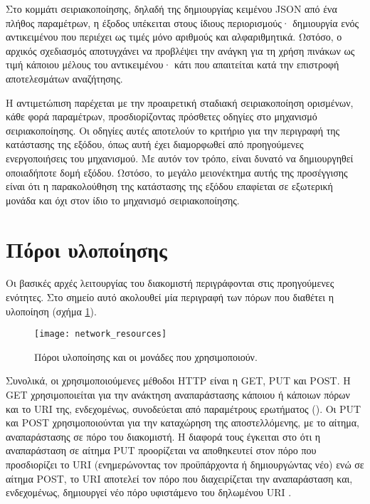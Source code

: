 Στο κομμάτι σειριακοποίησης, δηλαδή της δημιουργίας κειμένου JSON από ένα πλήθος
παραμέτρων, η έξοδος υπέκειται στους ίδιους περιορισμούς· δημιουργία ενός
αντικειμένου που περιέχει ως τιμές μόνο αριθμούς και αλφαριθμητικά. Ωστόσο, ο
αρχικός σχεδιασμός αποτυγχάνει να προβλέψει την ανάγκη για τη χρήση πινάκων ως
τιμή κάποιου μέλους του αντικειμένου· κάτι που απαιτείται κατά την επιστροφή
αποτελεσμάτων αναζήτησης.

Η αντιμετώπιση παρέχεται με την προαιρετική σταδιακή σειριακοποίηση ορισμένων,
κάθε φορά παραμέτρων, προσδιορίζοντας πρόσθετες οδηγίες στο μηχανισμό
σειριακοποίησης. Οι οδηγίες αυτές αποτελούν το κριτήριο για την περιγραφή της
κατάστασης της εξόδου, όπως αυτή έχει διαμορφωθεί από προηγούμενες
ενεργοποιήσεις του μηχανισμού. Με αυτόν τον τρόπο, είναι δυνατό να δημιουργηθεί
οποιαδήποτε δομή εξόδου. Ωστόσο, το μεγάλο μειονέκτημα αυτής της προσέγγισης
είναι ότι η παρακολούθηση της κατάστασης της εξόδου επαφίεται σε εξωτερική
μονάδα και όχι στον ίδιο το μηχανισμό σειριακοποίησης.


\section{Πόροι υλοποίησης}
\label{sec:network:impl-resources}


Οι βασικές αρχές λειτουργίας του διακομιστή περιγράφονται στις προηγούμενες
ενότητες. Στο σημείο αυτό ακολουθεί μία περιγραφή των πόρων που διαθέτει η
υλοποίηση (σχήμα \ref{fig:network:resources}).

\begin{figure}
    \caption{Πόροι υλοποίησης και οι μονάδες που χρησιμοποιούν.
    \label{fig:network:resources}}
    \begin{center}
    \texttt{[image: network\_resources]}
    \end{center}
\end{figure}

Συνολικά, οι χρησιμοποιούμενες μέθοδοι HTTP είναι η GET, PUT και POST. Η GET
χρησιμοποιείται για την ανάκτηση αναπαράστασης κάποιου ή κάποιων πόρων και το
URI της, ενδεχομένως, συνοδεύεται από παραμέτρους ερωτήματος
(). Οι PUT και POST χρησιμοποιούνται για την καταχώρηση της
αποστελλόμενης, με το αίτημα, αναπαράστασης σε πόρο του διακομιστή. Η διαφορά
τους έγκειται στο ότι η αναπαράσταση σε αίτημα PUT προορίζεται να αποθηκευτεί
στον πόρο που προσδιορίζει το URI (ενημερώνοντας τον προϋπάρχοντα ή
δημιουργώντας νέο) ενώ σε αίτημα POST, το URI αποτελεί τον πόρο που
διαχειρίζεται την αναπαράσταση και, ενδεχομένως, δημιουργεί νέο πόρο υφιστάμενο
του δηλωμένου URI \parencite[54--55]{rfc2616}.

